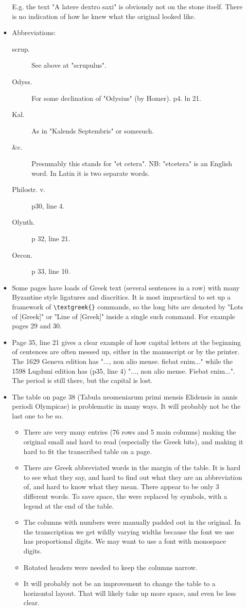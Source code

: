 \documentclass{report}
\begin{document}
\begin{itemize}
E.g. the text "A latere dextro saxi" is obviously not on the stone itself.
There is no indication
of how he knew what the original looked like.
\item
Abbreviations:
\begin{description}
\item[scrup.]See above at "scrupulus".
\item[Odyss.]For some declination of "Odysius" (by Homer). p4. ln 21.
\item[Kal.]As in "Kalends Septembris" or somesuch.
\item[\&c.]Presumably this stands for "et cetera". NB: "etcetera" is an English
word. In Latin it is two separate words.
\item[Philostr. v.]p30, line 4.
\item[Olynth.]p 32, line 21.
\item[Oecon.]p 33, line 10.
\end{description}
\item
Some pages have loads of Greek text (several sentences in a row) with many
Byzantine style ligatures and diacritics. It is most impractical to set up
a framework of \verb+\textgreek{}+ commands, so the long bits are denoted
by "Lots of [Greek]" or "Line of [Greek]" inside a single such command.
For example pages 29 and 30.
\item
Page 35, line 21 gives a clear example of how capital letters at the beginning
of centences are often messed up, either in the manuscript or by the printer.
The 1629 Geneva edition has "..., non alio mense. fiebat enim..." while the
1598 Lugduni edition has (p35, line 4) "..., non alio mense. Fiebat enim...".
The period is still there, but the capital is lost.
\item
The table on page 38 (Tabula neomeniarum primi mensis Elidensis in annis
periodi Olympicae) is problematic in many ways. It will probably not be 
the last one to be so.
\begin{itemize}
  \item{}There are very many entries (76 rows and 5 main columns) making the
  original small and hard to read (especially the Greek bits), and making it
  hard to fit the transcribed table on a page.
  \item{}There are Greek abbreviated words in the margin of the table. It is
  hard to see what they say, and hard to find out what they are an abbreviation
  of, and hard to know what they mean. There appear to be only 3 different
  words. To save space, the were replaced by symbols, with a legend at the
  end of the table.
  \item{}The columns with numbers were manually padded out in the original.
  In the transcription we get wildly varying widths  because the font we use
  has proportional digits. We may want to use a font with monospace digits.
  \item{}Rotated headers were needed to keep the columns narrow.
  \item{}It will probably not be an improvement to change the table to a
  horizontal layout. That will likely take up more space, and even be
  less clear.
\end{itemize}
\end{itemize}
\end{document}

